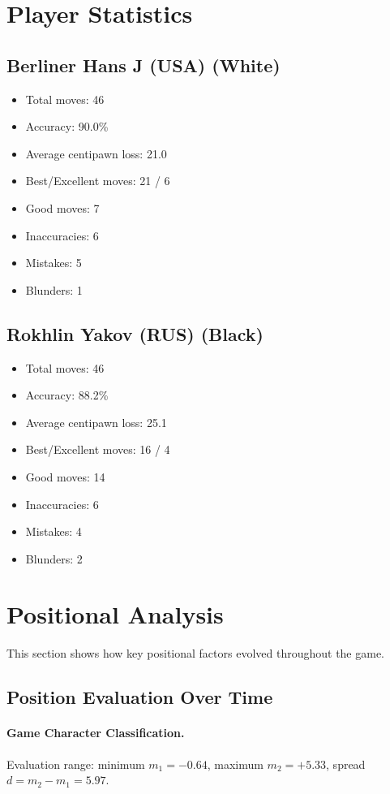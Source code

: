 \documentclass[11pt]{book}
\begin{document}
\section{Player Statistics}

\subsection{Berliner Hans J (USA) (White)}
\begin{itemize}
\item Total moves: 46
\item Accuracy: 90.0\%
\item Average centipawn loss: 21.0
\item Best/Excellent moves: 21 / 6
\item Good moves: 7
\item Inaccuracies: 6
\item Mistakes: 5
\item Blunders: 1
\end{itemize}

\subsection{Rokhlin Yakov (RUS) (Black)}
\begin{itemize}
\item Total moves: 46
\item Accuracy: 88.2\%
\item Average centipawn loss: 25.1
\item Best/Excellent moves: 16 / 4
\item Good moves: 14
\item Inaccuracies: 6
\item Mistakes: 4
\item Blunders: 2
\end{itemize}

\section{Positional Analysis}

This section shows how key positional factors evolved throughout the game.

\subsection{Position Evaluation Over Time}

\paragraph{Game Character Classification.}
Evaluation range: minimum $m_1 = -0.64$, maximum $m_2 = +5.33$, spread $d = m_2 - m_1 = 5.97$.
\end{document}
